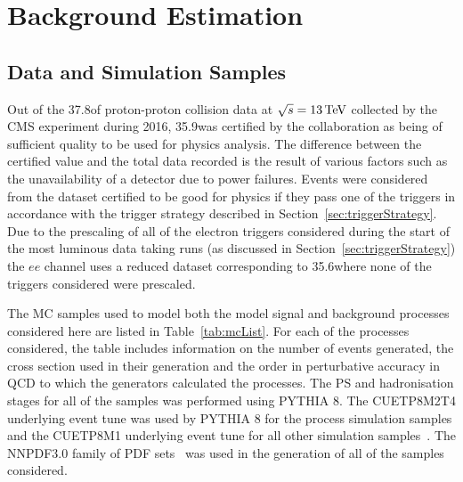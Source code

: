 \chapter{Background Estimation}\label{chapter:bkg}
%
%
%

%

\section{Data and Simulation Samples}\label{sec:samples}
Out of the 37.8\fbinv of proton-proton collision data at $\sqrt{s} = 13\,\text{Te\hspace{-.08em}V}$ collected by the CMS experiment during 2016, 35.9\fbinv was certified by the collaboration as being of sufficient quality to be used for physics analysis.
The difference between the certified value and the total data recorded is the result of various factors such as the unavailability of a detector due to power failures.
Events were considered from the dataset certified to be good for physics if they pass one of the triggers in accordance with the trigger strategy described in Section~\ref{sec:triggerStrategy}.
Due to the prescaling of all of the electron triggers considered during the start of the most luminous data taking runs (as discussed in Section~\ref{sec:triggerStrategy}) the $ee$ channel uses a reduced dataset corresponding to 35.6\fbinv where none of the triggers considered were prescaled.

The MC samples used to model both the model signal and background processes considered here are listed in Table~\ref{tab:mcList}.
For each of the processes considered, the table includes information on the number of events generated, the cross section used in their generation and the order in perturbative accuracy in QCD to which the generators calculated the processes.
The PS and hadronisation stages for all of the samples was performed using PYTHIA 8.
The CUETP8M2T4 underlying event tune was used by PYTHIA 8 for the \ttbar process simulation samples and the CUETP8M1 underlying event tune for all other simulation samples~\cite{Sirunyan:2019dfx}.
The NNPDF3.0 family of PDF sets~\cite{Ball:2012cx} was used in the generation of all of the samples considered.

